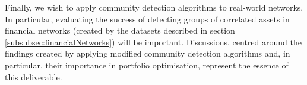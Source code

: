 \documentclass[12pt]{article}
\numberwithin{equation}{section}
\begin{document}
Finally, we wish to apply community detection algorithms to real-world networks. In particular, evaluating the success of detecting groups of correlated assets in financial networks (created by the datasets described in section \ref{subsubsec:financialNetworks}) will be important. Discussions, centred around the findings created by applying modified community detection algorithms and, in particular, their importance in portfolio optimisation, represent the essence of this deliverable.


\newpage
\thispagestyle{plain}
\mbox{}



\end{document}
